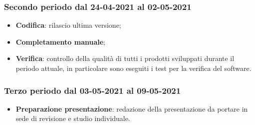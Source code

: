 	\subsubsection{Secondo periodo dal 24-04-2021 al 02-05-2021}
	\begin{itemize}
		\item \textbf{Codifica}: rilascio ultima versione;
		\item \textbf{Completamento manuale};
		\item \textbf{Verifica}: controllo della qualità di tutti i prodotti sviluppati durante il periodo attuale, in
		particolare sono eseguiti i test per la verifica del software.
	\end{itemize}

	\subsubsection{Terzo periodo dal 03-05-2021 al 09-05-2021}
	\begin{itemize}
		\item \textbf{Preparazione presentazione}: redazione della presentazione da portare in sede di revisione e
		studio individuale.
	\end{itemize}

	\newpage
	
	\newpage
